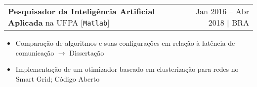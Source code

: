 \documentclass[a4paper,11pt]{article}
\makeatletter
\newcommand{\udensdot}[1]{%
    \tikz[baseline=(todotted.base)]{
        \node[inner sep=0.5pt,outer sep=0.5pt] (todotted) {#1};
        \draw[densely dotted] (todotted.south west) -- (todotted.south east);
    }%
}%
\newcommand{\myHref}[2]{\udensdot{\hspace{-1.2pt}\href{#1}{#2}\hspace{-4pt}}\hspace{-1.2pt}}
\newcommand{\myHrefIcn}[2]{#2 \href{#1}{\scriptsize{\faExternalLink{}}}}
\newcommand{\resumeItem}[2]{
  \item\small{
    \textbf{#1}{: #2 \vspace{-2pt}}
  }
}
\newcommand{\resumeItemCustom}[1]{
  \item\small{#1 \vspace{-2pt}}
}
\newcommand{\resumeJobSubheadingD}[7]{
  \vspace{0pt}\item
    \begin{tabular*}{0.97\textwidth}{l@{\extracolsep{\fill}}r}
      \textbf{#4} na \myHrefIcn{#1}{#2} \hspace{3pt} [\small \texttt{#6}] & {\small #5}
    \end{tabular*}\vspace{-6pt}
}
\newcommand{\resumeItemListStart}{\begin{itemize}}
\newcommand{\resumeItemListEnd}{\end{itemize}\vspace{-5pt}}
\makeatother
\begin{document}

    \resumeJobSubheadingD
      {http://www.lpo.ufpa.br/}{UFPA}%
      {Laboratório da faculdade da Engenharia Elétrica}%
      {Pesquisador da Inteligência Artificial Aplicada%
      }{Jan 2016 -- Abr 2018 $\vert$ BRA}
      {Matlab}%
      {Otimização de comunicação para Smart Grid por meio de posicionamento das células
      - Relacionado com o Mestrado}
      \resumeItemListStart
            \resumeItemCustom{Comparação de algoritmos e %
            suas configurações em relação à latência de comunicação $\rightarrow$ \myHrefIcn{http://www.repositorio.ufpa.br/jspui/bitstream/2011/10013/1/Dissertacao_ClusteringDrivenEquipament.pdf}{Dissertação}}
            \resumeItemCustom{Implementação de um otimizador baseado em clusterização para redes no Smart Grid;
            \myHrefIcn{https://github.com/vrbsky/network-model}{Código Aberto}}
      \resumeItemListEnd
\end{document}
